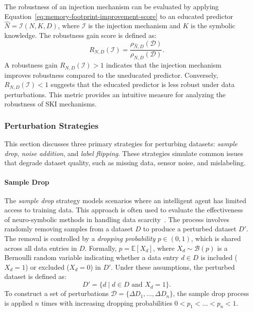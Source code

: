 %
The robustness of an injection mechanism can be evaluated by applying Equation~\eqref{eq:memory-footprint-improvement-score} to an educated predictor \(\hat{N} = \mathcal{I}(N, K, D)\), where \(\mathcal{I}\) is the injection mechanism and \(K\) is the symbolic knowledge.
%
The robustness gain score is defined as:
%
\begin{equation}
    \label{eq:robustness-gain}
    R_{N, D}(\mathcal{I}) = \frac{\rho_{\hat{N}, D}(\mathcal{D})}{\rho_{N, D}(\mathcal{D})}.
\end{equation}
%
A robustness gain \(R_{N, D}(\mathcal{I}) > 1\) indicates that the injection mechanism improves robustness compared to the uneducated predictor.
%
Conversely, \(R_{N, D}(\mathcal{I}) < 1\) suggests that the educated predictor is less robust under data perturbations.
%
This metric provides an intuitive measure for analyzing the robustness of \gls{SKI} mechanisms.


\subsubsection{Perturbation Strategies}\label{subsubsec:perturbation-strategies}
%
This section discusses three primary strategies for perturbing datasets: \emph{sample drop}, \emph{noise addition}, and \emph{label flipping}.
%
These strategies simulate common issues that degrade dataset quality, such as missing data, sensor noise, and mislabeling.

%
\paragraph{Sample Drop}
%
The \emph{sample drop} strategy models scenarios where an intelligent agent has limited access to training data.
%
This approach is often used to evaluate the effectiveness of neuro-symbolic methods in handling data scarcity~\cite{placeholder}.
%
The process involves randomly removing samples from a dataset \(D\) to produce a perturbed dataset \(D'\).
%
The removal is controlled by a \emph{dropping probability} \(p \in (0, 1)\), which is shared across all data entries in \(D\).
%
Formally, \(p = \mathbb{E}[X_d]\), where \(X_d \sim \mathcal{B}(p)\) is a Bernoulli random variable indicating whether a data entry \(d \in D\) is included (\(X_d = 1\)) or excluded (\(X_d = 0\)) in \(D'\).
%
Under these assumptions, the perturbed dataset is defined as:
%
\[
D' = \{d \mid d \in D \text{ and } X_d = 1\}.
\]
%
To construct a set of perturbations \(\mathcal{D} = \{\Delta D_1, \ldots, \Delta D_n\}\), the sample drop process is applied \(n\) times with increasing dropping probabilities \(0 < p_1 < \ldots < p_n < 1\).

